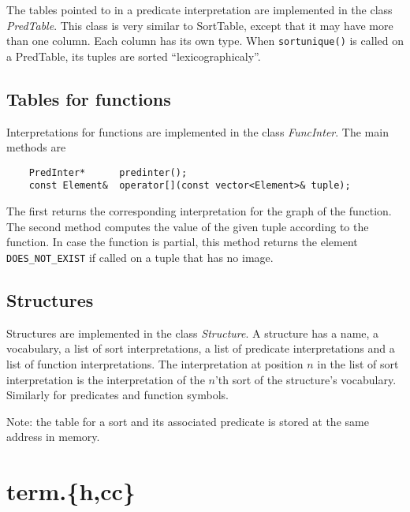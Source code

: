 \documentclass{article}
\begin{document}
The tables pointed to in a predicate interpretation are implemented in the class \emph{PredTable}. This class is very similar to SortTable, except that it may have more than one column. Each column has its own type. When \texttt{sortunique()} is called on a PredTable, its tuples are sorted ``lexicographicaly''. 

\subsection*{Tables for functions}

Interpretations for functions are implemented in the class \emph{FuncInter}. The main methods are
\begin{lstlisting}
	PredInter*      predinter();
	const Element&  operator[](const vector<Element>& tuple);
\end{lstlisting}
The first returns the corresponding interpretation for the graph of the function. The second method computes the value of the given tuple according to the function. In case the function is partial, this method returns the element \texttt{DOES\_NOT\_EXIST} if called on a tuple that has no image.

\subsection*{Structures}

Structures are implemented in the class \emph{Structure}. A structure has a name, a vocabulary, a list of sort interpretations, a list of predicate interpretations and a list of function interpretations. The interpretation at position $n$ in the list of sort interpretation is the interpretation of the $n$'th sort of the structure's vocabulary. Similarly for predicates and function symbols. 

Note: the table for a sort and its associated predicate is stored at the same address in memory. 

\section{term.\{h,cc\}}
\end{document}
